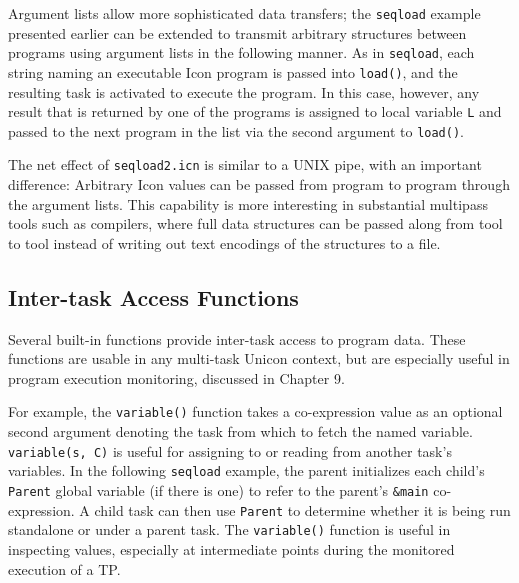 
Argument lists allow more sophisticated data transfers; the {\tt seqload} 
example presented earlier can be extended to transmit arbitrary
structures between programs using argument lists in the following
manner.  As in {\tt seqload}, each string naming an executable Icon
program is passed into {\tt load()}, and the resulting task is
activated to execute the program.  In this case, however, any result
that is returned by one of the programs is assigned to local variable
{\tt L} and passed to the next program in the list via the second
argument to {\tt load()}.


The net effect of {\tt seqload2.icn} is similar to a UNIX pipe, with
an important difference: Arbitrary Icon values can be passed from
program to program through the argument lists.
This capability is more interesting in substantial multipass tools
such as compilers, where full data structures can be passed along from
tool to tool instead of writing out text encodings of the structures
to a file.


\subsection*{Inter-task Access Functions}

Several built-in functions
provide inter-task access to program data.  These functions
are usable in any multi-task Unicon context, but are especially
useful in program execution monitoring, discussed in Chapter 9.

For example, the
{\tt variable()} function takes a co-expression value as an
optional second argument denoting the task from which to fetch the named
variable. {\tt variable(s, C)} is
useful for assigning to or reading from another task's
variables. In the following {\tt seqload} example, the
parent initializes each child's {\tt Parent} global
variable (if there is one) to refer to the parent's {\tt \&main}
co-expression.  A child task can then use {\tt Parent} to determine
whether it is being run standalone or under a parent task.
The {\tt variable()} function is
useful in inspecting values, especially at intermediate points during
the monitored execution of a TP.

